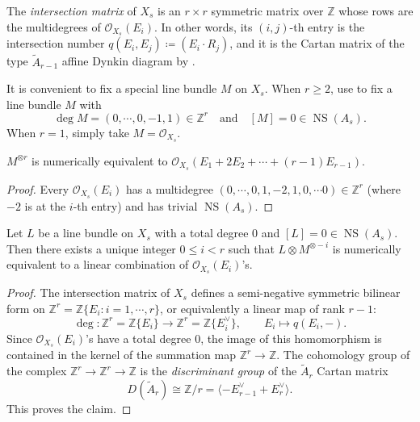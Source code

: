\documentclass[reqno, letterpaper]{amsart}
\numberwithin{equation}{subsection}
\let\to\longrightarrow
\let\mapsto\longmapsto
\newcommand{\ZZ}{\mathbb{Z}}
\DeclareMathOperator{\NS}{NS}
\begin{document}
			\begin{definition}
				The \emph{intersection matrix} of $X_s$ is an $r \times r$ symmetric matrix over $\ZZ$ whose rows are the multidegrees of $\mathcal O_{X_s} (E_i)$. In other words, its $(i,j)$-th entry is the intersection number $q(E_i, E_j) \coloneq (E_i \cdot R_j)$, and it is the Cartan matrix of the type $\tilde A_{r-1}$ affine Dynkin diagram by .
			\end{definition}
			
			It is convenient to fix a special line bundle $M$ on $X_s$. When $r \ge 2$, use  to fix a line bundle $M$ with
			\[ \deg M = (0, \cdots, 0, -1, 1) \in \ZZ^r \quad\mbox{and}\quad [M] = 0 \in \NS(A_s) .\]
			When $r = 1$, simply take $M = \mathcal O_{X_s}$.
			
			\begin{lemma} \label{lem:classification of component group:semistable 1}
				$M^{\otimes r}$ is numerically equivalent to $\mathcal O_{X_s} (E_1 + 2E_2 + \cdots + (r-1)E_{r-1})$.
			\end{lemma}
			\begin{proof}
				Every $\mathcal O_{X_s} (E_i)$ has a multidegree $(0, \cdots, 0, 1, -2, 1, 0, \cdots 0) \in \ZZ^r$ (where $-2$ is at the $i$-th entry) and has trivial $\NS(A_s)$.
			\end{proof}
			
			\begin{lemma} \label{lem:classification of component group:semistable 2}
				Let $L$ be a line bundle on $X_s$ with a total degree $0$ and $[L] = 0 \in \NS(A_s)$. Then there exists a unique integer $0 \le i < r$ such that $L \otimes M^{\otimes -i}$ is numerically equivalent to a linear combination of $\mathcal O_{X_s} (E_i)$'s.
			\end{lemma}
			\begin{proof}
				The intersection matrix of $X_s$ defines a semi-negative symmetric bilinear form on $\ZZ^r = \ZZ \{ E_i : i = 1, \cdots, r \}$, or equivalently a linear map of rank $r-1$:
				\[ \deg : \ZZ^r = \ZZ \{ E_i \} \to \ZZ^r = \ZZ \{ E_i^\vee \} ,\qquad E_i \mapsto q(E_i, -) .\]
				Since $\mathcal O_{X_s}(E_i)$'s have a total degree $0$, the image of this homomorphism is contained in the kernel of the summation map $\ZZ^r \to \ZZ$. The cohomology group of the complex $\ZZ^r \to \ZZ^r \to \ZZ$ is the \emph{discriminant group} of the $\tilde A_r$ Cartan matrix
				\[ D(\tilde A_r) \cong \ZZ/r = \langle -E_{r-1}^\vee + E_r^\vee \rangle .\]
				This proves the claim.
			\end{proof}
			
\end{document}
